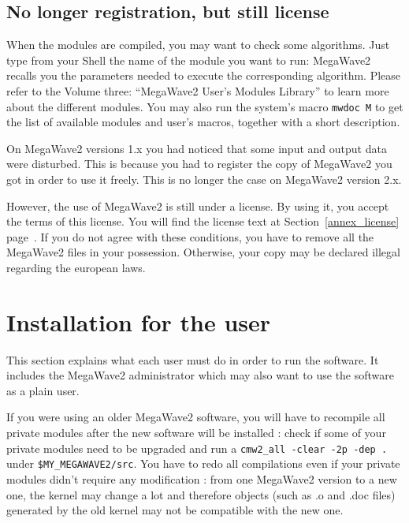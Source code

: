 \subsection{No longer registration, but still license}
\label{install_system_registration}

When the modules are compiled, you may want to check some algorithms. 
Just type from your Shell the name of the module you want to run: MegaWave2
recalls you the parameters needed to execute the corresponding algorithm.
Please refer to the Volume three: ``MegaWave2 User's Modules Library'' to learn more about the different modules.
You may also run the system's macro \verb+mwdoc M+ to get the list of available modules
and user's macros, together with a short description.

On MegaWave2 versions 1.x you had noticed that some input and output data were disturbed. 
This is because you had to register the copy of MegaWave2 you got in order to use it freely.
This is no longer the case on MegaWave2 version 2.x.

However, the use of MegaWave2 is still under a license. By using it, you accept the terms of this
license. 
You will find the license text at Section~\ref{annex_license} page~\pageref{annex_license}.
If you do not agree with these conditions, you have to remove all the MegaWave2 files in your possession. 
Otherwise, your copy may be declared illegal regarding the european laws.

\section{Installation for the user}
\label{install_user}

This section explains what each user must do in order to run the software.
It includes the MegaWave2 administrator which may also want to use the software as
a plain user.

If you were using an older MegaWave2 software, you will have to recompile all
private modules after the new software will be installed : check if some of your
private modules need to be upgraded and run a \verb+cmw2_all -clear -2p -dep .+ 
under \verb+$MY_MEGAWAVE2/src+. You have to redo all compilations even if your
private modules didn't require any modification : from one MegaWave2 version to a 
new one, the kernel may change a lot and therefore objects (such as .o and .doc files) 
generated by the old kernel may not be compatible with the new one.

